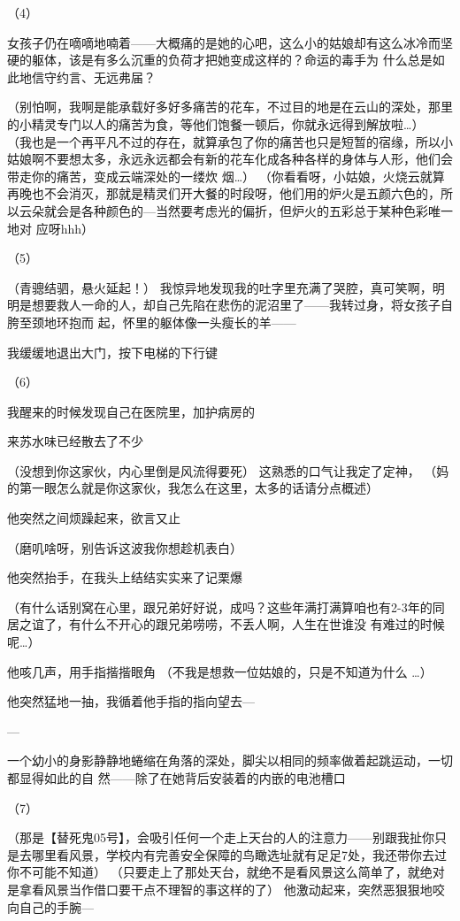 \documentclass{article}
\begin{document}
（4） 

女孩子仍在嘀嘀地喃着——大概痛的是她的心吧，这么小的姑娘却有这么冰冷而坚硬的躯体，该是有多么沉重的负荷才把她变成这样的？命运的毒手为
什么总是如此地信守约言、无远弗届？ 

（别怕啊，我啊是能承载好多好多痛苦的花车，不过目的地是在云山的深处，那里的小精灵专门以人的痛苦为食，等他们饱餐一顿后，你就永远得到解放啦…）
（我也是一个再平凡不过的存在，就算承包了你的痛苦也只是短暂的宿缘，所以小姑娘啊不要想太多，永远永远都会有新的花车化成各种各样的身体与人形，他们会带走你的痛苦，变成云端深处的一缕炊
\newpage
烟…）
（你看看呀，小姑娘，火烧云就算再晚也不会消灭，那就是精灵们开大餐的时段呀，他们用的炉火是五颜六色的，所以云朵就会是各种颜色的—当然要考虑光的偏折，但炉火的五彩总于某种色彩唯一地对
应呀hhh） 


（5） 

（青骢结驷，悬火延起！）
我惊异地发现我的吐字里充满了哭腔，真可笑啊，明明是想要救人一命的人，却自己先陷在悲伤的泥沼里了——我转过身，将女孩子自胯至颈地环抱而
起，怀里的躯体像一头瘦长的羊—— 


我缓缓地退出大门，按下电梯的下行键 


（6） 

我醒来的时候发现自己在医院里，加护病房的

\newpage
来苏水味已经散去了不少 

（没想到你这家伙，内心里倒是风流得要死）
这熟悉的口气让我定了定神，
（妈的第一眼怎么就是你这家伙，我怎么在这里，太多的话请分点概述）

他突然之间烦躁起来，欲言又止 

（磨叽啥呀，别告诉这波我你想趁机表白）

他突然抬手，在我头上结结实实来了记栗爆 

（有什么话别窝在心里，跟兄弟好好说，成吗？这些年满打满算咱也有2-3年的同居之谊了，有什么不开心的跟兄弟唠唠，不丢人啊，人生在世谁没
有难过的时候呢…） 

他咳几声，用手指揩揩眼角
（不我是想救一位姑娘的，只是不知道为什么
…） 

他突然猛地一抽，我循着他手指的指向望去—

\newpage
— 

一个幼小的身影静静地蜷缩在角落的深处，脚尖以相同的频率做着起跳运动，一切都显得如此的自
然——除了在她背后安装着的内嵌的电池槽口 


（7） 

（那是【替死鬼05号】，会吸引任何一个走上天台的人的注意力——别跟我扯你只是去哪里看风景，学校内有完善安全保障的鸟瞰选址就有足足7处，我还带你去过你不可能不知道）
（只要走上了那处天台，就绝不是看风景这么简单了，就绝对是拿看风景当作借口要干点不理智的事这样的了）
他激动起来，突然恶狠狠地咬向自己的手腕—
\end{document}

